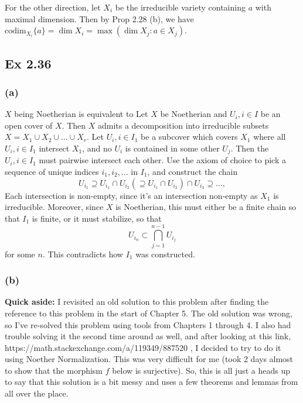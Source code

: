 \documentclass{article}
\theoremstyle{definition}
\newcommand{\codim}{\text{codim}}
\begin{document}
For the other direction, let $X_{i}$ be the irreducible variety containing $a$
with maximal dimension. Then by Prop 2.28 (b), we have $\codim_{X_i} \{a\} =
\dim X_i = \max(\dim X_j : a \in X_j)$.

\subsection*{Ex 2.36} 

\subsubsection*{(a)} 

$X$ being Noetherian is equivalent to 
Let $X$ be Noetherian and $U_i, i \in I$ be an open cover of $X$. Then $X$
admits a decomposition into irreducible subsets $X = X_1 \cup X_2 \cup \ldots
\cup X_r$. Let $U_i, i \in I_1$ be a subcover which covers $X_1$ where all
$U_i, i \in I_1$ intersect $X_1$, and no $U_i$ is contained in some other
$U_j$. Then the $U_i, i \in I_1$ must pairwise intersect each other. Use the
axiom of choice to pick a sequence of unique indices $i_1, i_2, \ldots$ in
$I_1$, and construct the chain
\[
	U_{i_1} \supseteq U_{i_1} \cap U_{i_2} (\supseteq U_{i_1} \cap U_{i_2})
	\cap U_{i_3} \supseteq \ldots,
\] 
Each intersection is non-empty, since it's an intersection non-empty as $X_1$
is irreducible. Moreover, since $X$ is Noetherian, this must either be a finite
chain so that $I_1$ is finite, or it must stabilize, so that 
\[
	U_{i_n} \subset \bigcap_{j = 1}^{n - 1} U_{i_j}
\] 
for some $n$. This contradicts how $I_1$ was constructed.

\subsubsection*{(b)} 

\textbf{Quick aside:} I revisited an old solution to this problem after finding
the reference to this problem in the start of Chapter 5. The old solution was
wrong, so I've re-solved this problem using tools from Chapters 1 through 4. I
also had trouble solving it the second time around as well, and after looking
at this link, https://math.stackexchange.com/a/119349/887520 , I decided to try
to do it using Noether Normalization. This was very difficult for me (took 2
days almost to show that the morphism $f$ below is surjective). So, this is all
just a heads up to say that this solution is a bit messy and uses a few
theorems and lemmas from all over the place. \\
\end{document}
